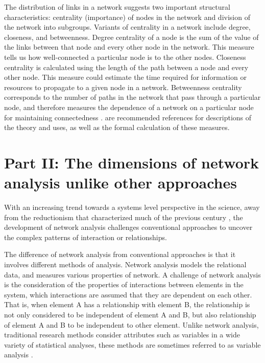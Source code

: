 The distribution of links in a network suggests two important structural characteristics: centrality (importance) of nodes in the network and division of the network into subgroups. Variants of centrality in a network include degree, closeness, and betweenness. Degree centrality of a node is the sum of the value of the links between that node and every other node in the network. This measure tells us how well-connected a particular node is to the other nodes. Closeness centrality is calculated using the length of the path between a node and every other node. This measure could estimate the time required for information or resources to propagate to a given node in a network. Betweenness centrality corresponds to the number of paths in the network that pass through a particular node, and therefore measures the dependence of a network on a particular node for maintaining connectedness .  are recommended references for descriptions of the theory and uses, as well as the formal calculation of these measures.


\section*{Part II: The dimensions of network analysis unlike other approaches}
\label{parttwo}


With an increasing trend towards a systems level perspective in the science, away from the reductionism that characterized much of the previous century , the development of network analysis challenges conventional approaches to uncover the complex patterns of interaction or relationships. 

The difference of network analysis from conventional approaches is that it involves different methods of analysis. 
Network analysis models the relational data, and measures various properties of network. A challenge of network analysis is the consideration of the properties of interactions  between elements in the system, which interactions are assumed that they are dependent on each other. That is, when element A has a relationship with element B, the relationship is not only considered to be independent of element A and B, but also relationship of element A and B to be independent to other element. Unlike network analysis, traditional research methods consider attributes such as variables in a wide variety of statistical analyses, these methods are sometimes referred to as variable analysis \cite{scott2012social}.

